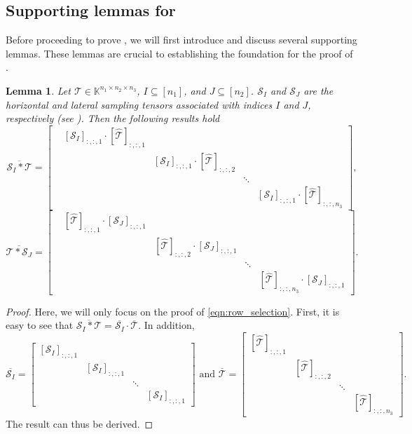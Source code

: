 \documentclass[twoside,12pt]{article}
\newtheorem{lemma}{Lemma}
\begin{document}
\subsection{Supporting lemmas for }
Before proceeding to prove , we will first introduce and discuss several supporting lemmas. These lemmas are crucial to establishing the foundation for the proof of .
\begin{lemma}\label{row_selection} 
 Let $\mathcal{T}\in\mathbb{K}^{n_1\times n_2\times n_3}$, $I\subseteq[n_1]$, and $J\subseteq[n_2]$. 
 $\mathcal{S}_I$  and $\mathcal{S}_J$ are the horizontal and lateral sampling tensors associated with indices $I$ and $J$, respectively (see ).  
 Then the following results hold
\begin{equation}\label{eqn:row_selection}
\overline{\mathcal{S}_{I}*\mathcal{T}}= 
\begin{bmatrix}
&[\mathcal{S}_{I}]_{:,:,1}\cdot
[\widehat{\mathcal{T}}]_{:,:,1} &  & &  \\
&&[\mathcal{S}_{I}]_{:,:,1}\cdot
[\widehat{\mathcal{T}}]_{:,:,2}&& \\ 
& &  &\ddots& \\
& & & &[\mathcal{S}_{I}]_{:,:,1}\cdot
[\widehat{\mathcal{T}}]_{:,:,n_3}
\end{bmatrix},
\end{equation}
\begin{equation}\label{eqn:col_selection}
    \overline{\mathcal{T}\ast \mathcal{S}_{J}}= 
\begin{bmatrix}
&[ \widehat{\mathcal{T}}]_{:,:,1} \cdot[\mathcal{S}_{J}]_{:,:,1}&&&\\
&&[ \widehat{\mathcal{T}}]_{:,:,2} \cdot[\mathcal{S}_{J}]_{:,:,1}&&\\
&&&\ddots& \\
&&&&[ \widehat{\mathcal{T}}]_{:,:,n_3} \cdot[\mathcal{S}_{J}]_{:,:,1}
\end{bmatrix}.
\end{equation}
\end{lemma}
\begin{proof}
Here, we will only focus on the proof of \eqref{eqn:row_selection}. First, it is easy to see that $\overline{\mathcal{S}_I*\mathcal{T}} = \overline{\mathcal{S}_I}\cdot \overline{\mathcal{T}}$. In addition, \[ \overline{\mathcal{S}_I}= 
\begin{bmatrix}
[\mathcal{S}_{I}]_{:,:,1}
 & & & \\
& [\mathcal{S}_{I}]_{:,:,1}& & \\
& & \ddots & \\
& & & [\mathcal{S}_{I}]_{:,:,1}
\end{bmatrix}\text{ and } \overline{\mathcal{T}}=
\begin{bmatrix}
    [\widehat{\mathcal{T}}]_{:,:,1}&&&\\
    &[\widehat{\mathcal{T}}]_{:,:,2}&&\\
    &&\ddots&\\
    &&&[\widehat{\mathcal{T}}]_{:,:,n_3}
\end{bmatrix}. 
\]   
 The result can thus be derived. 
\end{proof}
\end{document}
